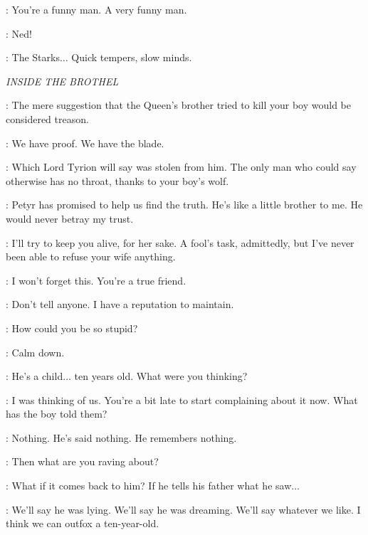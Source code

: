 
\NED: You're a funny man. A very funny man. 

\CATELYN:  Ned! 


\LITTLEFINGER:  The Starks$\ldots$ Quick tempers, slow minds. 

\scene

\textit{INSIDE THE BROTHEL}

\LITTLEFINGER: The mere suggestion that the Queen's brother tried to kill your boy would be considered treason. 

\CATELYN: We have proof. We have the blade. 

\LITTLEFINGER: Which Lord Tyrion will say was stolen from him. The only man who could say otherwise has no throat, thanks to your boy's wolf. 

\CATELYN: Petyr has promised to help us find the truth. He's like a little brother to me. He would never betray my trust. 

\LITTLEFINGER: I'll try to keep you alive, for her sake. A fool's task, admittedly, but I've never been able to refuse your wife anything. 

\CATELYN: I won't forget this. You're a true friend. 

\LITTLEFINGER: Don't tell anyone. I have a reputation to maintain. 

\scene



\CERSEI: How could you be so stupid? 

\JAIME: Calm down. 

\CERSEI: He's a child$\ldots$ ten years old. What were you thinking? 

\JAIME: I was thinking of us. You're a bit late to start complaining about it now. What has the boy told them? 

\CERSEI: Nothing. He's said nothing. He remembers nothing. 

\JAIME: Then what are you raving about? 

\CERSEI: What if it comes back to him? If he tells his father what he saw$\ldots$ 

\JAIME: We'll say he was lying. We'll say he was dreaming. We'll say whatever we like. I think we can outfox a ten-year-old. 


